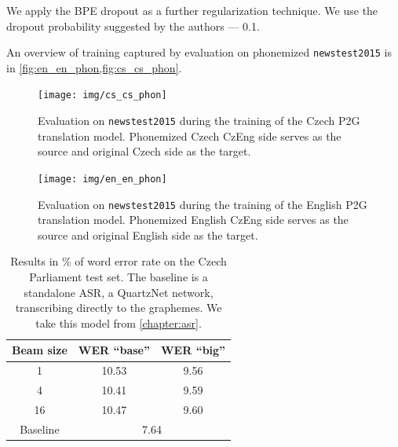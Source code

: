 We apply the BPE dropout  as a further regularization technique. We use the dropout probability suggested by the authors --- 0.1.

An overview of training captured by evaluation on phonemized \texttt{newstest2015} is in \cref{fig:en_en_phon,fig:cs_cs_phon}.

\begin{figure}[h]
	\texttt{[image: img/cs\_cs\_phon]}
	\caption[Czech ASR training captured on \texttt{newstest2015}]{Evaluation on \texttt{newstest2015} during the training of the Czech P2G translation model. Phonemized Czech CzEng side serves as the source and original Czech side as the target.}
	\label{fig:cs_cs_phon}
\end{figure}



\begin{figure}[h]
	\texttt{[image: img/en\_en\_phon]}
	\caption[English ASR training captured on \texttt{newstest2015}]{Evaluation on \texttt{newstest2015} during the training of the English P2G translation model. Phonemized English CzEng side serves as the source and original English side as the target.}
	\label{fig:en_en_phon}
\end{figure}




\begin{table}[t]
	\centering
	\begin{tabular}{c|cc}
		\bf Beam size & \bf WER ``base''& \bf WER ``big'' \\
		\hline
		1    &    10.53 & 9.56    \\
		4    &    10.41& 9.59    \\
		16    &    10.47& 9.60\\
		Baseline & \multicolumn{2}{c}{7.64} 
		
	\end{tabular}
	
	\caption[Czech enhanced ASR results]{Results in \% of word error rate on the Czech Parliament test set. The baseline is a standalone ASR, a QuartzNet network, transcribing directly to the graphemes. We take this model from \cref{chapter:asr}.}
	\label{tab:phon_cs}
\end{table}


